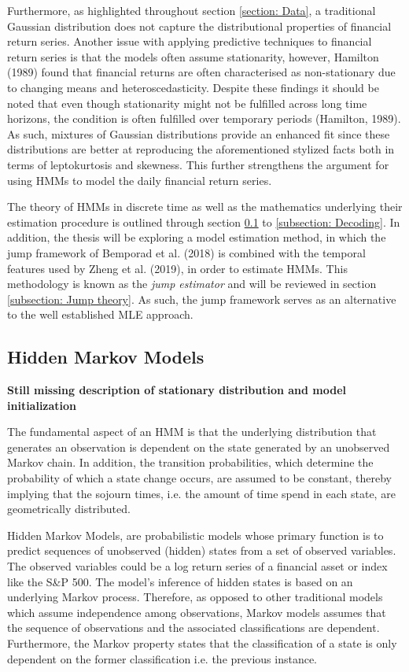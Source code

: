 Furthermore, as highlighted throughout section \ref{section: Data}, a traditional Gaussian distribution does not capture the distributional properties of financial return series. Another issue with applying predictive techniques to financial return series is that the models often assume stationarity, however, Hamilton (1989) found that financial returns are often characterised as non-stationary due to changing means and heteroscedasticity. Despite these findings it should be noted that even though stationarity might not be fulfilled across long time horizons, the condition is often fulfilled over temporary periods (Hamilton, 1989). As such, mixtures of Gaussian distributions provide an enhanced fit since these distributions are better at reproducing the aforementioned stylized facts both in terms of leptokurtosis and skewness. This further strengthens the argument for using HMMs to model the daily financial return series. 

The theory of HMMs in discrete time as well as the mathematics underlying their estimation procedure is outlined through section \ref{subsection: HMM} to \ref{subsection: Decoding}. In addition, the thesis will be exploring a model estimation method, in which the jump framework of Bemporad et al. (2018) is combined with the temporal features used by Zheng et al. (2019), in order to estimate HMMs. This methodology is known as the \textit{jump estimator} and will be reviewed in section \ref{subsection: Jump theory}. As such, the jump framework serves as an alternative to the well established MLE approach. 


\subsection{Hidden Markov Models}
\label{subsection: HMM}
\textbf{Still missing description of stationary distribution and model initialization}

The fundamental aspect of an HMM is that the underlying distribution that generates an observation is dependent on the state generated by an unobserved Markov chain. In addition, the transition probabilities, which determine the probability of which a state change occurs, are assumed to be constant, thereby implying that the sojourn times, i.e. the amount of time spend in each state, are geometrically distributed.

Hidden Markov Models, are probabilistic models whose primary function is to predict sequences of unobserved (hidden) states from a set of observed variables. The observed variables could be a log return series of a financial asset or index like the S\&P 500. The model’s inference of hidden states is based on an underlying Markov process. Therefore, as opposed to other traditional models which assume independence among observations, Markov models assumes that the sequence of observations and the associated classifications are dependent. Furthermore, the Markov property states that the classification of a state is only dependent on the former classification i.e. the previous instance. 

